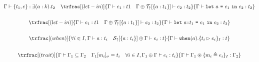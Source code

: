 \documentclass{article}[11pt]
\newcommand{\term}[1]{\verb~#1~}
\begin{document}
{\begin{gather*}
            {\Gamma \vdash \{t_1,e\} : \exists (a:k).t_2}
            ~~~
            \trfrac[(let-in)]
            {\Gamma \vdash e_1 : t1 ~~~ \Gamma \oplus {\cal T}_\uparrow[\{ a : t_1 \}] \vdash e_2 : t_2}
            {\Gamma \vdash \term{let} ~ a ~ \term{=} ~ e_1 ~ \term{in} ~ e_2 : t_2}
            \\\\
            \trfrac[(let-in)]
            {\Gamma \vdash e_1 : t1 ~~~ \Gamma \oplus {\cal T}_\uparrow[\{ a : t_1 \}] \vdash e_2 : t_2}
            {\Gamma \vdash \term{let} ~ a \term{:} t_1 ~ \term{=} ~ e_1 ~ \term{in} ~ e_2 : t_2}
            \\\\
            \trfrac[(when)]
            {\forall i \in I, \Gamma \vdash a : t_i ~~~ {\cal S}_\uparrow[\{ a : t_i \}] \oplus \Gamma \vdash e_i : t }
            {\Gamma \vdash \term{when}(a).\{ t_i \rhd e_i \}_I : t}
            \\\\
            \trfrac[(trait)]
            {\Gamma \vdash \Gamma_1 \subseteq \Gamma_2 ~~~ \Gamma_1[m_i]_\sigma = t_i ~~~ \forall i \in I, \Gamma_1 \oplus \Gamma \vdash e_i : t_i }
            {\Gamma \vdash \Gamma_1 \circledast \{ m_i \triangleq e_i \}_I : \Gamma_2 }\\
        \end{gather*}
    }
\end{document}
